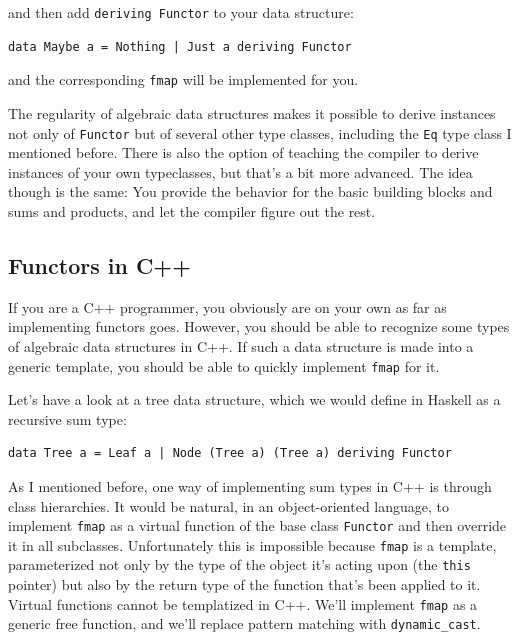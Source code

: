 and then add \texttt{deriving\ Functor} to your data structure:

\begin{verbatim}
data Maybe a = Nothing | Just a deriving Functor
\end{verbatim}

and the corresponding \texttt{fmap} will be implemented for you.

The regularity of algebraic data structures makes it possible to derive
instances not only of \texttt{Functor} but of several other type
classes, including the \texttt{Eq} type class I mentioned before. There
is also the option of teaching the compiler to derive instances of your
own typeclasses, but that's a bit more advanced. The idea though is the
same: You provide the behavior for the basic building blocks and sums
and products, and let the compiler figure out the rest.

\subsection{Functors in C++}\label{functors-in-c}

If you are a C++ programmer, you obviously are on your own as far as
implementing functors goes. However, you should be able to recognize
some types of algebraic data structures in C++. If such a data structure
is made into a generic template, you should be able to quickly implement
\texttt{fmap} for it.

Let's have a look at a tree data structure, which we would define in
Haskell as a recursive sum type:

\begin{verbatim}
data Tree a = Leaf a | Node (Tree a) (Tree a) deriving Functor
\end{verbatim}

As I mentioned before, one way of implementing sum types in C++ is
through class hierarchies. It would be natural, in an object-oriented
language, to implement \texttt{fmap} as a virtual function of the base
class \texttt{Functor} and then override it in all subclasses.
Unfortunately this is impossible because \texttt{fmap} is a template,
parameterized not only by the type of the object it's acting upon (the
\texttt{this} pointer) but also by the return type of the function
that's been applied to it. Virtual functions cannot be templatized in
C++. We'll implement \texttt{fmap} as a generic free function, and we'll
replace pattern matching with \texttt{dynamic\_cast}.

